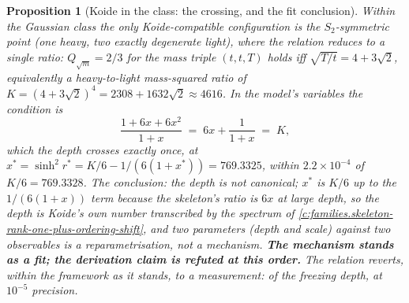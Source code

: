 \documentclass[11pt]{article}
\newtheorem{proposition}[theorem]{Proposition}
\theoremstyle{definition}
\theoremstyle{plain}
\newcommand{\changedmark}[2]{\marginpar{\raggedright\scriptsize\color{#1}#2}}
\begin{document}
\begin{proposition}[Koide in the class: the crossing, and the fit conclusion]\label{c:families.koide-class-crossing-fit-conclusion}
\changedmark{gray}{reworded}
Within the Gaussian class the only Koide-compatible configuration is the $S_{2}$-symmetric point (one heavy, two exactly degenerate light), where the relation reduces to a single ratio: $Q_{\sqrt{m}} = 2/3$ for the mass triple $(t, t, T)$ holds iff $\sqrt{T/t} = 4 + 3\sqrt{2}$, equivalently a heavy-to-light mass-squared ratio of $K = (4+3\sqrt{2})^{4} = 2308 + 1632\sqrt{2} \approx 4616$. In the model's variables the condition is
\begin{equation}
\frac{1 + 6x + 6x^{2}}{1 + x} \;=\; 6x + \frac{1}{1+x} \;=\; K,
\end{equation}
which the depth crosses exactly once, at $x^{*} = \sinh^{2}r^{*} = K/6 - 1/(6(1 + x^{*})) = 769.3325$, within $2.2 \times 10^{-4}$ of $K/6 = 769.3328$. The conclusion: the depth is not canonical; $x^{*}$ is $K/6$ up to the $1/(6(1+x))$ term because the skeleton's ratio is $6x$ at large depth, so the depth is Koide's own number transcribed by the spectrum of \ref{c:families.skeleton-rank-one-plus-ordering-shift}, and two parameters (depth and scale) against two observables is a reparametrisation, not a mechanism. \textbf{The mechanism stands as a fit; the derivation claim is refuted at this order.} The relation reverts, within the framework as it stands, to a measurement: of the freezing depth, at $10^{-5}$ precision.
\end{proposition}
\end{document}
